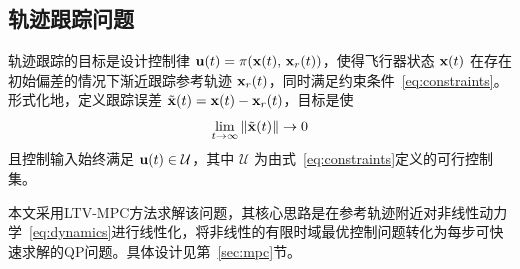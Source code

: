 \subsection{轨迹跟踪问题}

轨迹跟踪的目标是设计控制律 $\mathbf{u}(t) = \pi(\mathbf{x}(t),\, \mathbf{x}_r(t))$，使得飞行器状态 $\mathbf{x}(t)$ 在存在初始偏差的情况下渐近跟踪参考轨迹 $\mathbf{x}_r(t)$，同时满足约束条件~\eqref{eq:constraints}。形式化地，定义跟踪误差 $\tilde{\mathbf{x}}(t) = \mathbf{x}(t) - \mathbf{x}_r(t)$，目标是使
\begin{equation}
\lim_{t \to \infty} \|\tilde{\mathbf{x}}(t)\| \to 0
\end{equation}
且控制输入始终满足 $\mathbf{u}(t) \in \mathcal{U}$，其中 $\mathcal{U}$ 为由式~\eqref{eq:constraints}定义的可行控制集。

本文采用LTV-MPC方法求解该问题，其核心思路是在参考轨迹附近对非线性动力学~\eqref{eq:dynamics}进行线性化，将非线性的有限时域最优控制问题转化为每步可快速求解的QP问题。具体设计见第~\ref{sec:mpc}节。
